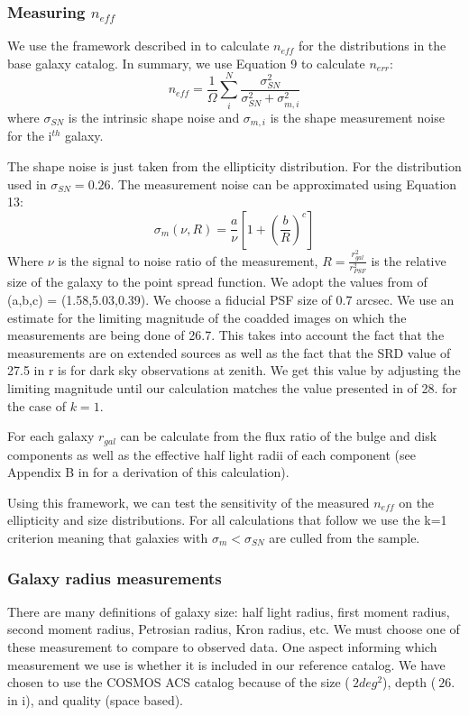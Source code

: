 \documentclass[]{article}
\begin{document}
\subsubsection{Measuring $n_{eff}$}
We use the framework described in \cite{chang} to calculate $n_{eff}$ for the distributions in the 
base galaxy catalog.  In summary, we use Equation 9 to calculate $n_{err}$:
\begin{equation}
n_{eff} = \frac{1}{\Omega}\sum^N_i\frac{\sigma^2_{SN}}{\sigma^2_{SN}+\sigma^2_{m,i}}
\end{equation}
where $\sigma_{SN}$ is the intrinsic shape noise and $\sigma_{m,i}$ is the shape measurement noise for the i$^{th}$ galaxy.

The shape noise is just taken from the ellipticity distribution.  For the distribution used in \cite{chang} $\sigma_{SN} = 0.26$.
The measurement noise can be approximated using Equation 13:
\begin{equation}
\sigma_m(\nu,R) = \frac{a}{\nu}\left[1+\left(\frac{b}{R}\right)^c\right]
\end{equation}
Where $\nu$ is the signal to noise ratio of the measurement, $R=\frac{r_{gal}^2}{r_{PSF}^2}$ is the relative size of the galaxy to
the point spread function.  We adopt the values from \cite{chang} of (a,b,c) = (1.58,5.03,0.39).  We choose a fiducial
PSF size of 0.7 arcsec. We use an estimate for the limiting magnitude of the coadded images on which the measurements are being
done of 26.7.  This takes into account the fact that the measurements are on extended sources as well as the fact that the SRD value 
of 27.5 in r is for dark sky observations at zenith.  We get this value by adjusting the limiting magnitude until our calculation
matches the value presented in \cite{chang} of 28. for the case of $k=1$.

For each galaxy $r_{gal}$ can be calculate from the flux ratio of the bulge and disk components as well as the effective half light 
radii of each component (see Appendix B in \cite{chang} for a derivation of this calculation).

Using this framework, we can test the sensitivity of the measured $n_{eff}$ on the ellipticity and size distributions.  For all calculations that follow we 
use the k=1 criterion meaning that galaxies with $\sigma_m < \sigma_{SN}$ are culled from the sample.

\subsubsection{Galaxy radius measurements}
There are many definitions of galaxy size: half light radius, first moment radius, second moment radius, Petrosian radius, Kron radius, etc.
We must choose one of these measurement to compare to observed data.  One aspect informing which measurement we use is whether it is included 
in our reference catalog.  We have chosen to use the COSMOS ACS catalog \cite{cosmos} because of the size ($~2deg^2$), depth ($~26.$ in i), and
quality (space based).  
\end{document}

